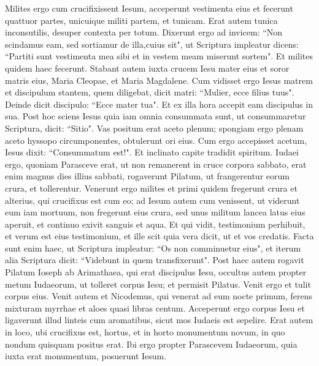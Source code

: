 \begin{biblechapter}
\verse Milites ergo cum crucifixissent Iesum, acceperunt vestimenta eius et fecerunt quattuor partes, unicuique militi partem, et tunicam. Erat autem tunica inconsutilis, desuper contexta per totum. 
\verse Dixerunt ergo ad invicem: “Non scindamus eam, sed sortiamur de illa,cuius sit", ut Scriptura impleatur dicens: “Partiti sunt vestimenta mea sibi et in vestem meam miserunt sortem". Et milites quidem haec fecerunt. 
\verse Stabant autem iuxta crucem Iesu mater eius et soror matris eius, Maria Cleopae, et Maria Magdalene. 
\verse Cum vidisset ergo Iesus matrem et discipulum stantem, quem diligebat, dicit matri: “Mulier, ecce filius tuus". 
\verse Deinde dicit discipulo: “Ecce mater tua". Et ex illa hora accepit eam discipulus in sua. 
\verse Post hoc sciens Iesus quia iam omnia consummata sunt, ut consummaretur Scriptura, dicit: “Sitio". 
\verse Vas positum erat aceto plenum; spongiam ergo plenam aceto hyssopo circumponentes, obtulerunt ori eius. 
\verse Cum ergo accepisset acetum, Iesus dixit: “Consummatum est!". Et inclinato capite tradidit spiritum. 
\verse Iudaei ergo, quoniam Parasceve erat, ut non remanerent in cruce corpora sabbato, erat enim magnus dies illius sabbati, rogaverunt Pilatum, ut frangerentur eorum crura, et tollerentur. 
\verse Venerunt ergo milites et primi quidem fregerunt crura et alterius, qui crucifixus est cum eo; 
\verse ad Iesum autem cum venissent, ut viderunt eum iam mortuum, non fregerunt eius crura,  
\verse sed unus militum lancea latus eius aperuit, et continuo exivit sanguis et aqua. 
\verse Et qui vidit, testimonium perhibuit, et verum est eius testimonium, et ille scit quia vera dicit, ut et vos credatis. 
\verse Facta sunt enim haec, ut Scriptura impleatur: “Os non comminuetur eius", 
\verse et iterum alia Scriptura dicit: “Videbunt in quem transfixerunt". 
\verse Post haec autem rogavit Pilatum Ioseph ab Arimathaea, qui erat discipulus Iesu, occultus autem propter metum Iudaeorum, ut tolleret corpus Iesu; et permisit Pilatus. Venit ergo et tulit corpus eius. 
\verse Venit autem et Nicodemus, qui venerat ad eum nocte primum, ferens mixturam myrrhae et aloes quasi libras centum. 
\verse Acceperunt ergo corpus Iesu et ligaverunt illud linteis cum aromatibus, sicut mos Iudaeis est sepelire. 
\verse Erat autem in loco, ubi crucifixus est, hortus, et in horto monumentum novum, in quo nondum quisquam positus erat. 
\verse Ibi ergo propter Parascevem Iudaeorum, quia iuxta erat monumentum, posuerunt Iesum. 
\end{biblechapter}

